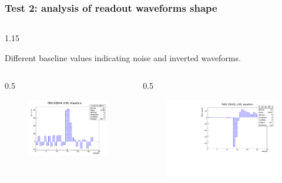 \documentclass{beamer}
\begin{document}
 
\begin{frame}
    \frametitle{Test 2: analysis of readout waveforms shape}
    \vspace{-4mm}
    \begin{columns}
\begin{column}{1.15\framewidth}
    \setlength{\leftmargini}{1.2em}
 \begin{itemize}
{\footnotesize \item Different baseline values indicating noise and inverted waveforms.}
  \end{itemize}
    \end{column}
    \end{columns}
        \vspace{-3mm}
    \begin{columns}
\begin{column}{0.5\framewidth}
         \begin{figure}[!h]
      \centering
      \hspace*{-2em}
      \includegraphics[width=\columnwidth]{figures/pdf/noise.pdf}
     \label{fig:normalhits}
\end{figure}
\end{column}
\begin{column}{0.5\framewidth}
      \begin{figure}[!h]
      \centering
            \hspace*{-1em}
\includegraphics[width=\columnwidth]{figures/pdf/wf_ch50_1.pdf}

\end{figure}
\end{column}
\end{columns}
\end{frame}
\end{document}
